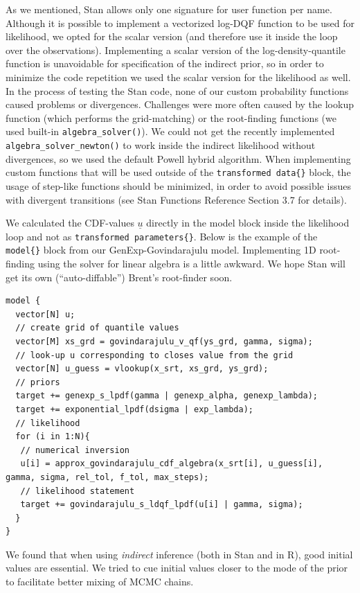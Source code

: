 \documentclass[
  12pt,
]{article}
\begin{document}
As we mentioned, Stan allows only one signature for user function per name. Although it is possible to implement a vectorized log-DQF function to be used for likelihood, we opted for the scalar version (and therefore use it inside the loop over the observations). Implementing a scalar version of the log-density-quantile function is unavoidable for specification of the indirect prior, so in order to minimize the code repetition we used the scalar version for the likelihood as well. In the process of testing the Stan code, none of our custom probability functions caused problems or divergences. Challenges were more often caused by the lookup function (which performs the grid-matching) or the root-finding functions (we used built-in \texttt{algebra\_solver()}). We could not get the recently implemented \texttt{algebra\_solver\_newton()} to work inside the indirect likelihood without divergences, so we used the default Powell hybrid algorithm. When implementing custom functions that will be used outside of the \texttt{transformed\ data\{\}} block, the usage of step-like functions should be minimized, in order to avoid possible issues with divergent transitions (see Stan Functions Reference Section 3.7 for details).

We calculated the CDF-values \(\underline u\) directly in the model block inside the likelihood loop and not as \texttt{transformed\ parameters\{\}}. Below is the example of the \texttt{model\{\}} block from our GenExp-Govindarajulu model. Implementing 1D root-finding using the solver for linear algebra is a little awkward. We hope Stan will get its own (``auto-diffable'') Brent's root-finder soon.

\begin{verbatim}
model {
  vector[N] u;
  // create grid of quantile values
  vector[M] xs_grd = govindarajulu_v_qf(ys_grd, gamma, sigma);
  // look-up u corresponding to closes value from the grid
  vector[N] u_guess = vlookup(x_srt, xs_grd, ys_grd);
  // priors
  target += genexp_s_lpdf(gamma | genexp_alpha, genexp_lambda);
  target += exponential_lpdf(dsigma | exp_lambda);
  // likelihood
  for (i in 1:N){
   // numerical inversion
   u[i] = approx_govindarajulu_cdf_algebra(x_srt[i], u_guess[i], gamma, sigma, rel_tol, f_tol, max_steps);
   // likelihood statement
   target += govindarajulu_s_ldqf_lpdf(u[i] | gamma, sigma);
  }
}
\end{verbatim}

We found that when using \emph{indirect} inference (both in Stan and in R), good initial values are essential. We tried to cue initial values closer to the mode of the prior to facilitate better mixing of MCMC chains.
\end{document}

